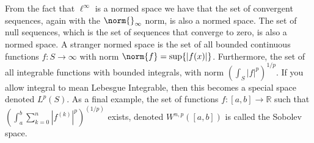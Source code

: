 \documentclass[crop=false,class=article,oneside]{standalone}
\begin{document}
        From the fact that $\ell^{\infty}$ is a normed space
        we have that the set of convergent sequences,
        again with the $\norm{}_{\infty}$ norm, is also
        a normed space. The set of null sequences, which
        is the set of sequences that converge to zero,
        is also a normed space. A stranger normed space
        is the set of all bounded continuous functions
        $f:S\rightarrow\infty$ with norm
        $\norm{f}=\sup\{|f(x)|\}$. Furthermore, the
        set of all integrable functions with
        bounded integrals, with norm
        $(\int_{S}|f|^{p})^{1/p}$. If you allow integral
        to mean Lebesgue Integrable, then this becomes
        a special space denoted $L^{p}(S)$. As a final
        example, the set of functions
        $f:[a,b]\rightarrow\mathbb{R}$ such that
        $(\int_{a}^{b}\sum_{k=0}^{n}|f^{(k)}|^{p})^{(1/p)}$
        exists, denoted $W^{n,p}([a,b])$ is called
        the Sobolev space.
\end{document}
